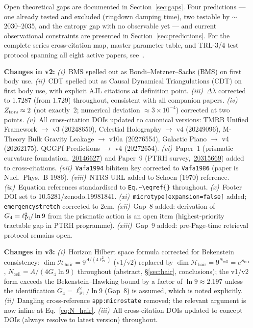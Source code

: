\documentclass[11pt,a4paper]{article}
\begin{document}
Open theoretical gaps are documented in Section~\ref{sec:gaps}.
Four predictions --- one already tested and excluded (ringdown damping time), two testable by $\sim$2030--2035, and the entropy gap with no observable yet --- and current observational constraints are
presented in Section~\ref{sec:predictions}.
For the complete series cross-citation map, master parameter table, and
TRL-3/4 test protocol spanning all eight active papers, see~\cite{BresslerSurvey2026}.

\smallskip
\noindent\textbf{Changes in v2:}
\textit{(i)}~BMS spelled out as Bondi--Metzner--Sachs (BMS) on first body use.
\textit{(ii)}~CDT spelled out as Causal Dynamical Triangulations (CDT) on first body use, with explicit AJL citations at definition point.
\textit{(iii)}~$\Delta\lambda$ corrected to 1.7287 (from 1.729) throughout, consistent with all companion papers.
\textit{(iv)}~$Z_{\rm tors} \approx 2$ (not exactly~2; numerical deviation ${\approx}3\times10^{-4}$) corrected at two points.
\textit{(v)}~All cross-citation DOIs updated to canonical versions: TMRB Unified Framework $\to$ v3 (20248650), Celestial Holography $\to$ v4 (20249096), M-Theory Bulk Gravity Leakage $\to$ v10a (20276554), Galactic Piano $\to$ v4 (20262175), QGGPf Predictions $\to$ v4 (20272654).
\textit{(vi)}~Paper~1 (prismatic curvature foundation,~\href{https://doi.org/10.5281/zenodo.20146627}{20146627}) and Paper~9 (PTRH survey,~\href{https://doi.org/10.5281/zenodo.20315669}{20315669}) added to cross-citations.
\textit{(vii)}~\texttt{Vafa1994} bibitem key corrected to \texttt{Vafa1986} (paper is Nucl.~Phys.~B 1986).
\textit{(viii)}~NTRS URL added to Schoen (1970) reference.
\textit{(ix)}~Equation references standardised to \texttt{Eq.\textasciitilde\textbackslash eqref\{\}} throughout.
\textit{(x)}~Footer DOI set to 10.5281/zenodo.19981841.
\textit{(xi)}~\texttt{microtype[expansion=false]} added; \texttt{emergencystretch} corrected to 2em.
\textit{(xii)}~Gap~8 added: derivation of $G_4 = \ell_{\rm Pl}^2/\ln 9$ from the prismatic action is an open item (highest-priority tractable gap in PTRH programme).
\textit{(xiii)}~Gap~9 added: pre-Page-time retrieval protocol remains open.

\smallskip
\noindent\textbf{Changes in v3:}
\textit{(i)}~Horizon Hilbert space formula corrected for Bekenstein consistency:
$\dim\mathcal{H}_{\mathrm{hair}} = 9^{A/(4\ell_{\mathrm{Pl}}^2)}$ (v1/v2) replaced by
$\dim\mathcal{H}_{\mathrm{hair}} = 9^{N_{\mathrm{cell}}} = e^{S_{\mathrm{BH}}}$,
$N_{\mathrm{cell}} = A/(4G_4\ln 9)$ throughout (abstract, \S\ref{sec:hair},
conclusions); the v1/v2 form exceeds the Bekenstein--Hawking bound by a factor
of $\ln 9 \approx 2.197$ unless the identification $G_4 = \ell_{\mathrm{Pl}}^2/\ln 9$
(Gap~8) is assumed, which is noted explicitly.
\textit{(ii)}~Dangling cross-reference \texttt{app:microstate} removed; the
relevant argument is now inline at Eq.~\eqref{eq:N_hair}.
\textit{(iii)}~All cross-citation DOIs updated to concept DOIs (always resolve
to latest version) throughout.
\end{document}
